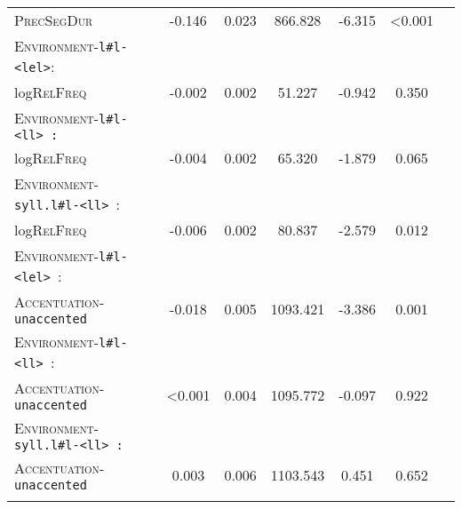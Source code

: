 \begin{table}[H]
{\begin{tabular}{lSSSSSS}
		\textsc{PrecSegDur} & -0.146 & 0.023 & 866.828 & -6.315 & <0.001  \\ 
		
		\textsc{Environment}-\texttt{l\#l-<lel>}: &&&&&\\
		log\textsc{RelFreq }& \color{lsGuidelinesGray}-0.002 &\color{lsGuidelinesGray} 0.002 & \color{lsGuidelinesGray}51.227 &\color{lsGuidelinesGray} -0.942 & \color{lsGuidelinesGray}0.350 \\ 
		
		\textsc{Environment}-\texttt{l\#l-<ll> :}  &&&&&\\
		log\textsc{RelFreq }&\color{lsGuidelinesGray} -0.004 & \color{lsGuidelinesGray}0.002 &\color{lsGuidelinesGray} 65.320 & \color{lsGuidelinesGray}-1.879 &\color{lsGuidelinesGray} 0.065 \\ 
		
		\textsc{Environment}-\texttt{syll.l\#l-<ll> }: &&&&&\\
		log\textsc{RelFreq }& -0.006 & 0.002 & 80.837 & -2.579 & 0.012 \\ 
		
		\textsc{Environment}-\texttt{l\#l-<lel> }: &&&&&\\
		\textsc{Accentuation}-\texttt{unaccented} & -0.018 & 0.005 & 1093.421 & -3.386 & 0.001 \\ 
		
		\textsc{Environment}-\texttt{l\#l-<ll> }: &&&&&\\
		\textsc{Accentuation}-\texttt{unaccented} & \color{lsGuidelinesGray}<0.001&\color{lsGuidelinesGray} 0.004 &\color{lsGuidelinesGray} 1095.772 & \color{lsGuidelinesGray}-0.097 & \color{lsGuidelinesGray}0.922 \\ 
		
		\textsc{Environment}-\texttt{syll.l\#l-<ll> :} &&&&&\\
		\textsc{Accentuation}-\texttt{unaccented} &\color{lsGuidelinesGray} 0.003 & \color{lsGuidelinesGray}0.006 &\color{lsGuidelinesGray} 1103.543 & \color{lsGuidelinesGray}0.451 &\color{lsGuidelinesGray} 0.652 \\ 
	\lspbottomrule 
			\end{tabular}}
\end{table}




